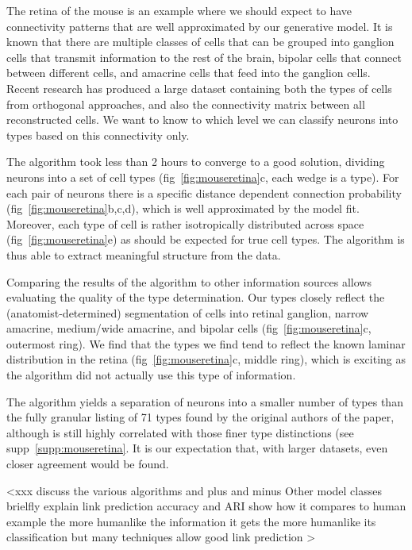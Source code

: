\documentclass{nature}
\begin{document}
The retina of the mouse \autocite{Masland2001} is an example where we
should expect to have connectivity patterns that are well approximated
by our generative model. It is known that there are multiple classes
of cells that can be grouped into ganglion cells that transmit
information to the rest of the brain, bipolar cells that connect
between different cells, and amacrine cells that feed into the
ganglion cells. Recent research
\autocite{Helmstaedter2013} has produced a large dataset containing
both the types of cells from orthogonal approaches, and also the
connectivity matrix between all reconstructed cells. We want to know
to which level we can classify neurons into types based on this
connectivity only.

The algorithm took less than 2 hours to converge to a good solution,
dividing neurons into a set of cell types (fig~\ref{fig:mouseretina}c, each
wedge is a type). For each pair of neurons there is a specific
distance dependent connection probability (fig~\ref{fig:mouseretina}b,c,d),
which is well approximated by the model fit. Moreover, each type of
cell is rather isotropically distributed across space
(fig~\ref{fig:mouseretina}e) as should be expected for true cell types. The
algorithm is thus able to extract meaningful structure from the data.

Comparing the results of the algorithm to other information sources
allows evaluating the quality of the type determination. Our types
closely reflect the (anatomist-determined) segmentation of cells into
retinal ganglion, narrow amacrine, medium/wide amacrine, and bipolar
cells (fig~\ref{fig:mouseretina}c, outermost ring). We find that the
types we find tend to reflect the known laminar distribution in the
retina (fig~\ref{fig:mouseretina}c, middle ring), which is exciting as
the algorithm did not actually use this type of information.



The algorithm yields a separation of neurons into a smaller number of
types than the fully granular listing of 71 types found by the
original authors of the paper, although is still highly correlated
with those finer type distinctions (see
supp~\ref{supp:mouseretina}. It is our expectation that, with larger
datasets, even closer agreement would be found.

<xxx discuss the various algorithms and plus and minus 
   Other model classes
   brielfly explain link prediction accuracy and ARI
   show how it compares to human example	
   the more humanlike the information it gets the more humanlike its classification but many techniques allow good link prediction
>
\end{document}
